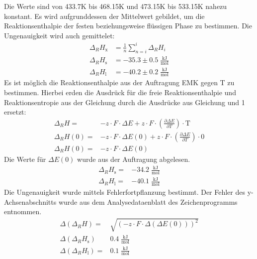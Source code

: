 \documentclass[12pt,a4paper,titlepage,headinclude,bibtotoc]{scrartcl}
\begin{document}
\FloatBarrier
Die Werte sind von 433.7\;K bis 468.15\;K und 473.15\;K bis 533.15\;K nahezu konstant. Es wird aufgrunddessen der Mittelwert gebildet, um die Reaktionsenthalpie der festen beziehungsweise flüssigen Phase zu bestimmen. Die Ungenauigkeit wird auch gemittelet:
\begin{align}
\Delta_R H_{\text{x}}&= \frac{1}{n}  \sum_{n=i}^i \Delta_R H_i  \\
\Delta_R H_{\text{s}}&= -35.3 \pm 0.5\;\frac{\text{kJ}}{\text{mol}}\\
\Delta_R H_{\text{l}}&= -40.2 \pm 0.2\;\frac{\text{kJ}}{\text{mol}}
\end{align}
Es ist möglich die Reaktionsenthalpie aus der Auftragung EMK gegen T zu bestimmen. Hierbei erden die Ausdrück für die freie Reaktionsenthalpie und Reaktionsentropie aus der Gleichung  durch die Ausdrücke aus Gleichung und 1 ersetzt:
\begin{align}
\Delta_R H=&  - z\cdot F \cdot\Delta E +  z \cdot F \cdot (\frac{\partial \Delta E}{\partial T})\cdot\text{T} \\ 
\Delta_R H(0)=&  - z\cdot F\cdot \Delta E(0) +  z \cdot F \cdot (\frac{\partial \Delta E}{\partial T})\cdot 0\\ 
\Delta_R H(0)=&  - z\cdot F \cdot\Delta E(0)
\end{align}
Die Werte für $\Delta E(0)$ wurde aus der Auftragung abgelesen. 
\begin{align}
\Delta_R H_{\text{s}}=& -34.2\;\frac{\text{kJ}}{\text{mol}}\\
\Delta_R H_{\text{l}}=&  -40.1\;\frac{\text{kJ}}{\text{mol}}
\end{align}
Die Ungenauigkeit wurde mittels Fehlerfortpflanzung bestimmt. Der Fehler des y-Achsenabschnitts wurde aus dem Analysedataenblatt des Zeichenprogramms entnommen.
\begin{align}
\Delta(\Delta_R H)=& \sqrt{(- z\cdot F \cdot\Delta(\Delta E(0)))^2}\\
\Delta(\Delta_R H_{\text{s}})&  0.4\;\frac{\text{kJ}}{\text{mol}}\\
\Delta(\Delta_R H_{\text{l}})=&  0.1\;\frac{\text{kJ}}{\text{mol}}
\end{align}
\end{document}
